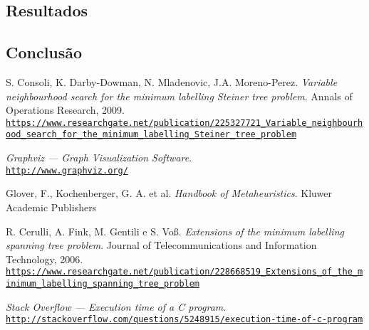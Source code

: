 \documentclass[12pt, a4paper]{article}
\begin{document}
\subsection{Resultados}
\subsection{Conclusão}

\begin{thebibliography}{9}

S. Consoli, K. Darby-Dowman, N. Mladenovic, J.A. Moreno-Perez.
\textit{Variable neighbourhood search for the minimum labelling Steiner tree
problem}.
Annals of Operations Research, 2009.
\tiny
\\\texttt{\url{https://www.researchgate.net/publication/225327721_Variable_neighbourhood_search_for_the_minimum_labelling_Steiner_tree_problem}}
\normalsize

\textit{Graphviz --- Graph Visualization Software}. \\
\tiny
\texttt{\url{http://www.graphviz.org/}}
\normalsize

Glover, F., Kochenberger, G. A. et al.
\textit{Handbook of Metaheuristics}.
Kluwer Academic Publishers

R. Cerulli, A. Fink, M. Gentili e S. Voß.
\textit{Extensions of the minimum labelling spanning tree problem}.
Journal of Telecommunications and Information Technology, 2006.
\tiny
\\\texttt{\url{https://www.researchgate.net/publication/228668519_Extensions_of_the_minimum_labelling_spanning_tree_problem}}
\normalsize

\textit{Stack Overflow --- Execution time of a C program}. \\
\tiny
\texttt{\url{http://stackoverflow.com/questions/5248915/execution-time-of-c-program}}
\normalsize

\end{thebibliography}
\end{document}
